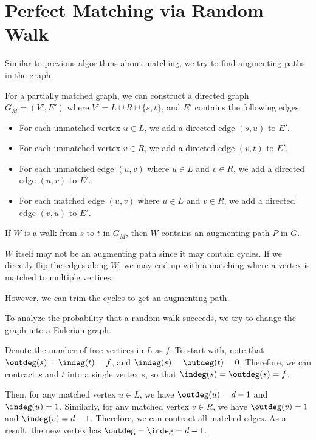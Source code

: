 \section{Perfect Matching via Random Walk}

Similar to previous algorithms about matching, we try to find augmenting paths in the graph.

For a partially matched graph, we can construct a directed graph $G_M = (V', E')$ where $V' = L \cup R \cup \{s,t\}$, and $E'$ contains the following edges:
\begin{itemize}
	\item For each unmatched vertex $u \in L$, we add a directed edge $(s,u)$ to $E'$.
	\item For each unmatched vertex $v \in R$, we add a directed edge $(v,t)$ to $E'$.
	\item For each unmatched edge $(u,v)$ where $u \in L$ and $v \in R$, we add a directed edge $(u,v)$ to $E'$.
	\item For each matched edge $(u,v)$ where $u \in L$ and $v \in R$, we add a directed edge $(v,u)$ to $E'$.
\end{itemize}

\begin{lemma}
	If $W$ is a walk from $s$ to $t$ in $G_M$, then $W$ contains an augmenting path $P$ in $G$.
\end{lemma}
\begin{remark}
	$W$ itself may not be an augmenting path since it may contain cycles. If we directly flip the edges along $W$, we may end up with a matching where a vertex is matched to multiple vertices.

	However, we can trim the cycles to get an augmenting path.
\end{remark}

To analyze the probability that a random walk succeeds, we try to change the graph into a Eulerian graph.

Denote the number of free vertices in $L$ as $f$.
To start with, note that $\outdeg(s) = \indeg(t) = f$, and $\indeg(s) = \outdeg(t) = 0$. Therefore, we can contract $s$ and $t$ into a single vertex $s$, so that $\indeg(s) = \outdeg(s) = f$.

Then, for any matched vertex $u\in L$, we have $\outdeg(u) = d-1$ and $\indeg(u) = 1$. Similarly, for any matched vertex $v \in R$, we have $\outdeg(v) = 1$ and $\indeg(v) = d-1$. Therefore, we can contract all matched edges. As a result, the new vertex has $\outdeg = \indeg = d-1$.

